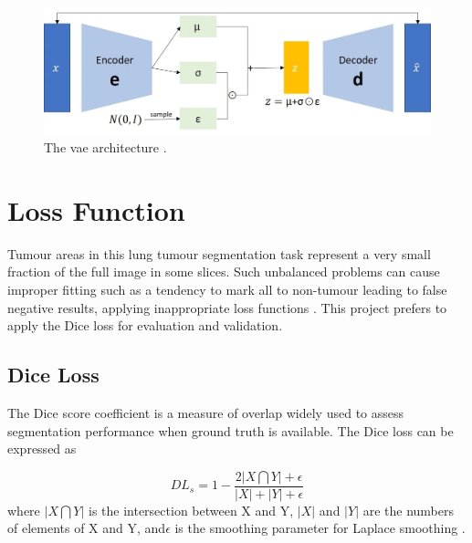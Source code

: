 \documentclass[11pt,times,oneside,openright]{eeereport}
\begin{document}
\begin{figure}[h]
    \centering
    \includegraphics[width=\textwidth]{fig/vae.png}
    \caption{The \acrshort{vae} architecture \cite{kingma2013auto}.}
    \label{fig:vae}
\end{figure}



\section{Loss Function}
Tumour areas in this lung tumour segmentation task represent a very small fraction of the full image in some slices. Such unbalanced problems can cause improper fitting such as a tendency to mark all to non-tumour leading to false negative results, applying inappropriate loss functions \cite{sudre2017generalised}. This project prefers to apply the Dice loss for evaluation and validation.
\subsection{Dice Loss}
The Dice score coefficient is a measure of overlap widely
used to assess segmentation performance when ground truth is available. The Dice loss can be expressed as

\begin{equation}
    DL_{s}=1-\frac{2|X \bigcap Y| + \epsilon }{|X|+|Y| + \epsilon}
\end{equation}
where \(|X \bigcap Y|\) is the intersection between X and Y, \(|X|\) and \(|Y|\) are the numbers of elements of X and Y, and\(\epsilon\) is the smoothing parameter for Laplace smoothing \cite{sudre2017generalised}.
\end{document}
